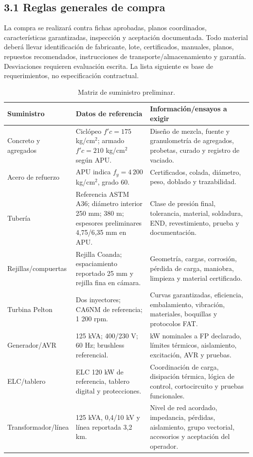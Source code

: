 \documentclass[11pt,a4paper]{article}
\begin{document}
\subsection*{3.1 Reglas generales de compra}
La compra se realizará contra fichas aprobadas, planos coordinados, características garantizadas, inspección y aceptación documentada. Todo material deberá llevar identificación de fabricante, lote, certificados, manuales, planos, repuestos recomendados, instrucciones de transporte/almacenamiento y garantía. Desviaciones requieren evaluación escrita. La lista siguiente es base de requerimientos, no especificación contractual.
\begin{table}[H]\centering\small
\begin{tabularx}{\textwidth}{p{2.4cm}p{5.1cm}Y}\toprule Suministro & Datos de referencia & Información/ensayos a exigir\\\midrule
Concreto y agregados & Ciclópeo $f'c=175$ kg/cm$^2$; armado $f'c=210$ kg/cm$^2$ según APU. & Diseño de mezcla, fuente y granulometría de agregados, probetas, curado y registro de vaciado.\\
Acero de refuerzo & APU indica $f_y=4\,200$ kg/cm$^2$, grado 60. & Certificados, colada, diámetro, peso, doblado y trazabilidad.\\
Tubería & Referencia ASTM A36; diámetro interior 250 mm; 380 m; espesores preliminares 4,75/6,35 mm en APU. & Clase de presión final, tolerancia, material, soldadura, END, revestimiento, prueba y documentación.\\
Rejillas/compuertas & Rejilla Coanda; espaciamiento reportado 25 mm y rejilla fina en cámara. & Geometría, cargas, corrosión, pérdida de carga, maniobra, limpieza y material certificado.\\
Turbina Pelton & Dos inyectores; CA6NM de referencia; 1 200 rpm. & Curvas garantizadas, eficiencia, embalamiento, vibración, materiales, boquillas y protocolos FAT.\\
Generador/AVR & 125 kVA; 400/230 V; 60 Hz; brushless referencial. & kW nominales a FP declarado, límites térmicos, aislamiento, excitación, AVR y pruebas.\\
ELC/tablero & ELC 120 kW de referencia, tablero digital y protecciones. & Coordinación de carga, disipación térmica, lógica de control, cortocircuito y pruebas funcionales.\\
Transformador/línea & 125 kVA, 0,4/10 kV y línea reportada 3,2 km. & Nivel de red acordado, impedancia, pérdidas, aislamiento, grupo vectorial, accesorios y aceptación del operador.\\
\bottomrule\end{tabularx}\caption{Matriz de suministro preliminar.}\end{table}
\end{document}
